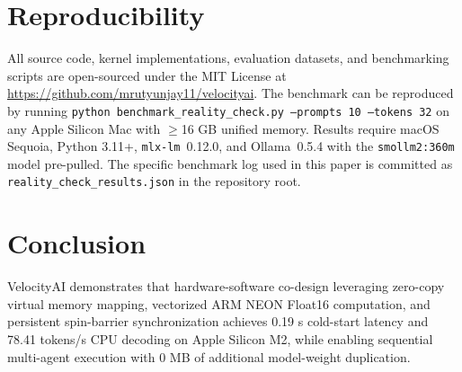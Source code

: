\documentclass[a4paper,twocolumn,10pt]{article}
\begin{document}
\section{Reproducibility}
All source code, kernel implementations, evaluation datasets, and benchmarking scripts are open-sourced under the MIT License at \url{https://github.com/mrutyunjay11/velocityai}. The benchmark can be reproduced by running \texttt{python benchmark\_reality\_check.py --prompts 10 --tokens 32} on any Apple Silicon Mac with $\geq$16 GB unified memory. Results require macOS Sequoia, Python 3.11+, \texttt{mlx-lm}~0.12.0, and Ollama~0.5.4 with the \texttt{smollm2:360m} model pre-pulled. The specific benchmark log used in this paper is committed as \texttt{reality\_check\_results.json} in the repository root.

\section{Conclusion}
VelocityAI demonstrates that hardware-software co-design leveraging zero-copy virtual memory mapping, vectorized ARM NEON Float16 computation, and persistent spin-barrier synchronization achieves 0.19 s cold-start latency and 78.41 tokens/s CPU decoding on Apple Silicon M2, while enabling sequential multi-agent execution with 0 MB of additional model-weight duplication.



\end{document}
